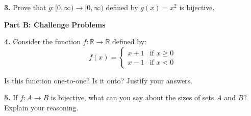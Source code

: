 \documentclass[12pt]{article}
\begin{document}
\textbf{3.} Prove that $g: [0, \infty) \to [0, \infty)$ defined by $g(x) = x^2$ is bijective.
\vspace{4cm}

\textbf{Part B: Challenge Problems}

\textbf{4.} Consider the function $f: \mathbb{R} \to \mathbb{R}$ defined by:
$$f(x) = \begin{cases} 
x + 1 & \text{if } x \geq 0 \\
x - 1 & \text{if } x < 0
\end{cases}$$

Is this function one-to-one? Is it onto? Justify your answers.
\vspace{4cm}

\textbf{5.} If $f: A \to B$ is bijective, what can you say about the sizes of sets $A$ and $B$? Explain your reasoning.
\vspace{3cm}
\end{document}
